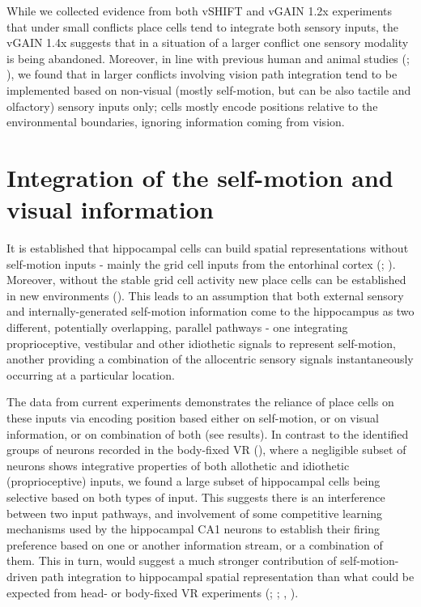While we collected evidence from both vSHIFT and vGAIN 1.2x experiments that under small conflicts place cells tend to integrate both sensory inputs, the vGAIN 1.4x suggests that in a situation of a larger conflict one sensory modality is being abandoned. Moreover, in line with previous human and animal studies (\cite{Zhao2015}; \cite{Shettleworth2005}), we found that in larger conflicts involving vision path integration tend to be implemented based on non-visual (mostly self-motion, but can be also tactile and olfactory) sensory inputs only; cells mostly encode positions relative to the environmental boundaries, ignoring information coming from vision.


\section{Integration of the self-motion and visual information}
\label{sec:integration_sm_vision}

It is established that hippocampal cells can build spatial representations without self-motion inputs - mainly the grid cell inputs from the entorhinal cortex (\cite{Poucet2015}; \cite{Muessig2015}). Moreover, without the stable grid cell activity new place cells can be established in new environments (\cite{Brandon2014}). This leads to an assumption that both external sensory and internally-generated self-motion information come to the hippocampus as two different, potentially overlapping, parallel pathways - one integrating proprioceptive, vestibular and other idiothetic signals to represent self-motion, another providing a combination of the allocentric sensory signals instantaneously occurring at a particular location.

The data from current experiments demonstrates the reliance of place cells on these inputs via encoding position based either on self-motion, or on visual information, or on combination of both (see results). In contrast to the identified groups of neurons recorded in the body-fixed VR (\cite{Haas2019}), where a negligible subset of neurons shows integrative properties of both allothetic and idiothetic (proprioceptive) inputs, we found a large subset of hippocampal cells being selective based on both types of input. This suggests there is an interference between two input pathways, and involvement of some competitive learning mechanisms used by the hippocampal CA1 neurons to establish their firing preference based on one or another information stream, or a combination of them. This in turn, would suggest a much stronger contribution of self-motion-driven path integration to hippocampal spatial representation than what could be expected from head- or body-fixed VR experiments (\cite{Jayakumar2018}; \cite{Haas2019}; \cite{Chen2013}, \cite{Aronov2014}).

